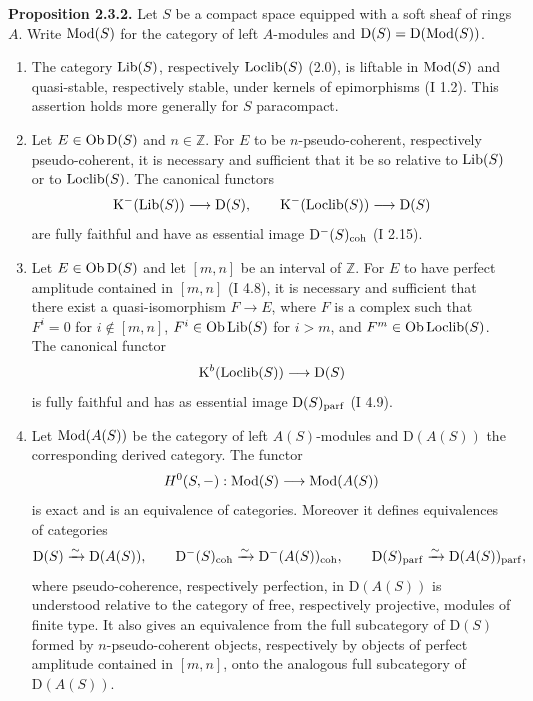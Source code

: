 \documentclass[11pt]{article}
\begin{document}
\textbf{Proposition 2.3.2.} Let $S$ be a compact space equipped with a soft sheaf of rings $A$. Write $\operatorname{Mod}(S)$ for the category of left $A$-modules and $\mathrm D(S)=\mathrm D(\operatorname{Mod}(S))$.
\begin{enumerate}[label=\alph*)]
\item The category $\operatorname{Lib}(S)$, respectively $\operatorname{Loclib}(S)$ (2.0), is liftable in $\operatorname{Mod}(S)$ and quasi-stable, respectively stable, under kernels of epimorphisms (I 1.2). This assertion holds more generally for $S$ paracompact.
\item Let $E\in\operatorname{Ob}\mathrm D(S)$ and $n\in\mathbb Z$. For $E$ to be $n$-pseudo-coherent, respectively pseudo-coherent, it is necessary and sufficient that it be so relative to $\operatorname{Lib}(S)$ or to $\operatorname{Loclib}(S)$. The canonical functors
\[
\mathrm K^{-}(\operatorname{Lib}(S))\longrightarrow \mathrm D(S),
\qquad
\mathrm K^{-}(\operatorname{Loclib}(S))\longrightarrow \mathrm D(S)
\]
are fully faithful and have as essential image $\mathrm D^{-}(S)_{\mathrm{coh}}$ (I 2.15).
\item Let $E\in\operatorname{Ob}\mathrm D(S)$ and let $[m,n]$ be an interval of $\mathbb Z$. For $E$ to have perfect amplitude contained in $[m,n]$ (I 4.8), it is necessary and sufficient that there exist a quasi-isomorphism $F\to E$, where $F$ is a complex such that $F^i=0$ for $i\notin[m,n]$, $F^i\in\operatorname{Ob}\operatorname{Lib}(S)$ for $i>m$, and $F^m\in\operatorname{Ob}\operatorname{Loclib}(S)$. The canonical functor
\[
\mathrm K^b(\operatorname{Loclib}(S))\longrightarrow \mathrm D(S)
\]
is fully faithful and has as essential image $\mathrm D(S)_{\mathrm{parf}}$ (I 4.9).
\item Let $\operatorname{Mod}(A(S))$ be the category of left $A(S)$-modules and $\mathrm D(A(S))$ the corresponding derived category. The functor
\[
H^0(S,-):\operatorname{Mod}(S)\longrightarrow\operatorname{Mod}(A(S))
\]
is exact and is an equivalence of categories. Moreover it defines equivalences of categories
\[
\mathrm D(S)\xrightarrow{\sim}\mathrm D(A(S)),\qquad
\mathrm D^{-}(S)_{\mathrm{coh}}\xrightarrow{\sim}\mathrm D^{-}(A(S))_{\mathrm{coh}},\qquad
\mathrm D(S)_{\mathrm{parf}}\xrightarrow{\sim}\mathrm D(A(S))_{\mathrm{parf}},
\]
where pseudo-coherence, respectively perfection, in $\mathrm D(A(S))$ is understood relative to the category of free, respectively projective, modules of finite type. It also gives an equivalence from the full subcategory of $\mathrm D(S)$ formed by $n$-pseudo-coherent objects, respectively by objects of perfect amplitude contained in $[m,n]$, onto the analogous full subcategory of $\mathrm D(A(S))$.
\end{enumerate}
\end{document}

